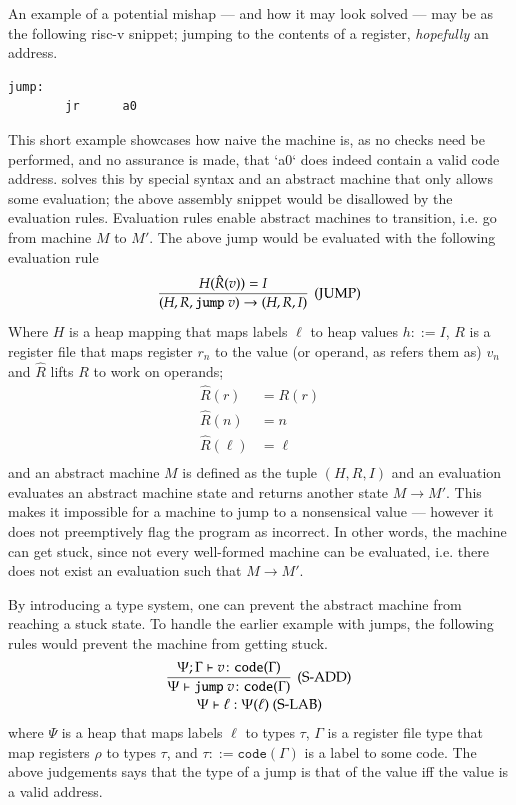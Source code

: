 An example of a potential mishap --- and how it may look solved --- may be as
the following risc-v snippet; jumping to the contents of a register,
\emph{hopefully} an address.
\begin{lstlisting}
jump:
        jr      a0
\end{lstlisting}
This short example showcases how naive the machine is, as no checks need be
performed, and no assurance is made, that `a0` does indeed contain a valid code
address.
\talz solves this by special syntax and an abstract machine that only allows
some evaluation; the above assembly snippet would be disallowed by the
evaluation rules.
Evaluation rules enable abstract machines to transition, i.e. go from machine
$M$ to $M'$.
The above jump would be evaluated with the following evaluation rule
\begin{equation*}
    \infer[(\text{JUMP})]
    {(H, R, \texttt{jump}\ v) \rightarrow (H, R, I)}
    {H(\hat R (v)) = I}
\end{equation*}
Where $H$ is a heap mapping that maps labels $\ell$ to heap values $h ::= I$,
$R$ is a register file that maps register $r_n$ to the value (or operand, as
\talz refers them as) $v_n$ and $\hat R$ lifts $R$ to work on operands;
\begin{align*}
    \hat R(r) &= R(r) \\
    \hat R(n) &= n \\
    \hat R(\ell) &= \ell \\
\end{align*}
and an abstract machine $M$ is defined as the tuple $(H, R, I)$ and an
evaluation evaluates an abstract machine state and returns another state $M
\rightarrow M'$.
This makes it impossible for a machine to jump to a nonsensical value ---
however it does not preemptively flag the program as incorrect. In other words,
the machine can get stuck, since not every well-formed machine can be
evaluated, i.e. there does not exist an evaluation such that $M \rightarrow
M'$.

By introducing a type system, one can prevent the abstract machine from
reaching a stuck state. To handle the earlier example with jumps, the following
rules would prevent the machine from getting stuck.
\begin{equation*}
    \begin{array}{c}
        \infer[(\text{S-ADD})]
            {\Psi \vdash \texttt{jump}\ v \colon \texttt{code}(\Gamma)}
            {\Psi; \Gamma \vdash v \colon \texttt{code}(\Gamma)}
        \\
        \deduce
            {\Psi \vdash \ell : \Psi(\ell)}
            {}\ 
            (\text{S-LAB})
    \end{array}
\end{equation*}
where $\Psi$ is a heap that maps labels $\ell$ to types $\tau$, $\Gamma$ is a
register file type that map registers $\rho$ to types $\tau$, and $\tau ::=
\texttt{code}(\Gamma)$ is a label to some code.
The above judgements says that the type of a jump is that of the value iff the
value is a valid address.

